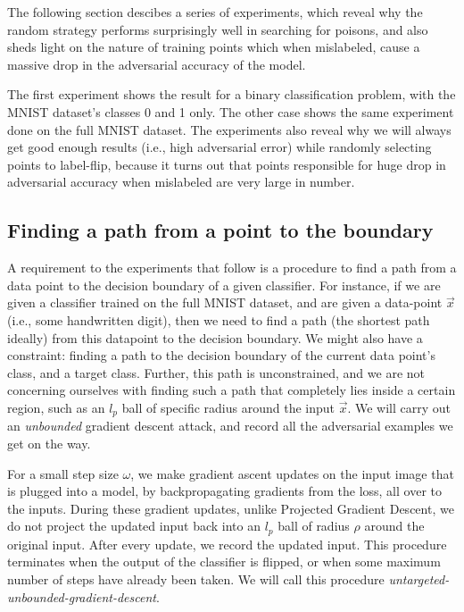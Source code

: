 \documentclass{ociamthesis}
\begin{document}
The following section descibes a series of experiments, which reveal why the
random strategy performs surprisingly well in searching for poisons, and also
sheds light on the nature of training points which when mislabeled, cause a
massive drop in the adversarial accuracy of the model.

The first experiment shows the result for a binary classification problem, with
the MNIST dataset's classes 0 and 1 only. The other case shows the same
experiment done on the full MNIST dataset. The experiments also reveal why we
will always get good enough results (i.e., high adversarial error) while
randomly selecting points to label-flip, because it turns out that points
responsible for huge drop in adversarial accuracy when mislabeled are very large
in number.

\subsection{Finding a path from a point to the boundary}

A requirement to the experiments that follow is a procedure to find a path from
a data point to the decision boundary of a given classifier. For instance, if we
are given a classifier trained on the full MNIST dataset, and are given a
data-point $\vec{x}$ (i.e., some handwritten digit), then we need to find a path
(the shortest path ideally) from this datapoint to the decision boundary. We
might also have a constraint: finding a path to the decision boundary of the
current data point's class, and a target class. Further, this path is
unconstrained, and we are not concerning ourselves with finding such a path that
completely lies inside a certain region, such as an $l_p$ ball of specific
radius around the input $\vec{x}$. We will carry out an \emph{unbounded}
gradient descent attack, and record all the adversarial examples we get on the
way.

For a small step size $\omega$, we make gradient ascent updates on the input
image that is plugged into a model, by backpropagating gradients from the loss,
all over to the inputs. During these gradient updates, unlike Projected Gradient
Descent, we do not project the updated input back into an $l_p$ ball of radius
$\rho$ around the original input. After every update, we record the updated
input. This procedure terminates when the output of the classifier is flipped,
or when some maximum number of steps have already been taken. We will call this
procedure \emph{untargeted-unbounded-gradient-descent}.
\end{document}

